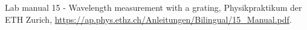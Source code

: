
\begin{thebibliography}{99}

Lab manual 15 - Wavelength measurement with a grating, Physikpraktikum der ETH Zurich,  \url{https://ap.phys.ethz.ch/Anleitungen/Bilingual/15_Manual.pdf}.



\end{thebibliography}